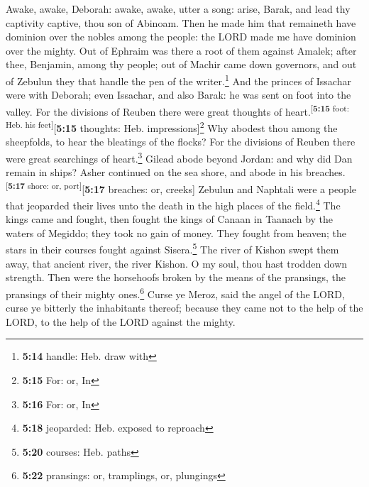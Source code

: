  Awake, awake, Deborah: awake, awake, utter a song:
arise, Barak, and lead thy captivity captive, thou son of Abinoam.
 Then he made him that remaineth have dominion over the
nobles among the people: the LORD made me have dominion over the mighty.
 Out of Ephraim was there a root of them against Amalek;
after thee, Benjamin, among thy people; out of Machir came down
governors, and out of Zebulun they that handle the pen of the
writer.\footnote{\textbf{5:14} handle: Heb. draw with} 
And the princes of Issachar were with Deborah; even Issachar, and also
Barak: he was sent on foot into the valley. For the divisions of Reuben
there were great thoughts of heart.\textsuperscript{{[}\textbf{5:15}
foot: Heb. his feet{]}}{[}\textbf{5:15} thoughts: Heb.
impressions{]}\footnote{\textbf{5:15} For: or, In}  Why
abodest thou among the sheepfolds, to hear the bleatings of the flocks?
For the divisions of Reuben there were great searchings of
heart.\footnote{\textbf{5:16} For: or, In}  Gilead abode
beyond Jordan: and why did Dan remain in ships? Asher continued on the
sea shore, and abode in his breaches.\textsuperscript{{[}\textbf{5:17}
shore: or, port{]}}{[}\textbf{5:17} breaches: or, creeks{]}
 Zebulun and Naphtali were a people that jeoparded their
lives unto the death in the high places of the field.\footnote{\textbf{5:18}
  jeoparded: Heb. exposed to reproach}  The kings came
and fought, then fought the kings of Canaan in Taanach by the waters of
Megiddo; they took no gain of money.  They fought from
heaven; the stars in their courses fought against Sisera.\footnote{\textbf{5:20}
  courses: Heb. paths}  The river of Kishon swept them
away, that ancient river, the river Kishon. O my soul, thou hast trodden
down strength.  Then were the horsehoofs broken by the
means of the pransings, the pransings of their mighty ones.\footnote{\textbf{5:22}
  pransings: or, tramplings, or, plungings}  Curse ye
Meroz, said the angel of the LORD, curse ye bitterly the inhabitants
thereof; because they came not to the help of the LORD, to the help of
the LORD against the mighty.


